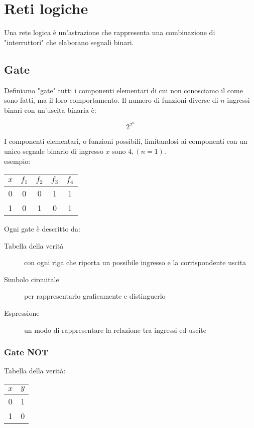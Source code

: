 \documentclass{subfiles}
\begin{document}
\section{Reti logiche}

Una rete logica è un'astrazione che rappresenta una combinazione di "interruttori" che elaborano segnali binari.

\subsection{Gate}

Definiamo "gate" tutti i componenti elementari di cui non conosciamo il come sono fatti, ma il loro comportamento.
Il numero di funzioni diverse di $n$ ingressi binari con un'uscita binaria è:

$$
2^{2^n}
$$

\noindent
I componenti elementari, o funzioni possibili, limitandosi ai componenti con un unico segnale binario di ingresso $x$ sono $4, (n = 1)$.\\

\noindent
esempio:

\begin{center}
\begin{tabular}{ |c|c|c|c|c| }
\hline
$x$ & $f_1$ & $f_2$ & $f_3$ & $f_4$ \\
\hline
\hline
0 & 0 & 0 & 1 & 1 \\
1 & 0 & 1 & 0 & 1 \\
\hline
\end{tabular}
\end{center}

\noindent
Ogni gate è descritto da:

\begin{description}
	\item[Tabella della verità] con ogni riga che riporta un possibile ingresso e la corrispondente uscita
	\item[Simbolo circuitale] per rappresentarlo graficamente e distinguerlo
	\item[Espressione] un modo di rappresentare la relazione tra ingressi ed uscite
\end{description}

\subsubsection{Gate NOT}

Tabella della verità:

\begin{center}
\begin{tabular}{ |c|c| }
\hline
$x$ & $y$ \\
\hline
\hline
0 & 1 \\
1 & 0 \\
\hline
\end{tabular}
\end{center}
\end{document}
